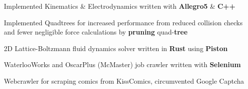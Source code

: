 \documentclass[]{chandan-cv}
\begin{document}
\begin{minipage}[t]{0.75\textwidth}
\descript{ }
\location{ }
\begin{tightemize}
	\item Implemented Kinematics \& Electrodynamics written with \textbf{Allegro5} \& \textbf{C++}
	\item Implemented Quadtrees for increased performance from reduced collision checks and fewer 
	negligible force calculations by \textbf{pruning} quad-\textbf{tree}
\end{tightemize}
\sectionsep

\descript{ }
\location{ }
\begin{tightemize}
	\item 2D Lattice-Boltzmann fluid dynamics solver written in \textbf{Rust} using \textbf{Piston}
	\item WaterlooWorks and OscarPlus (McMaster) job crawler written with \textbf{Selenium}
	\item Webcrawler for scraping comics from KissComics, circumvented Google Captcha
\end{tightemize}
\sectionsep



%
%

\end{minipage}
\end{document}
